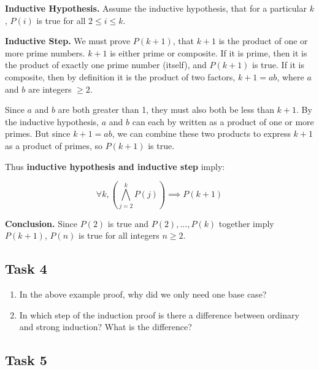 \documentclass[12pt,letterpaper]{article}
\begin{document}
\textbf{Inductive Hypothesis.} Assume the inductive hypothesis, that for a particular $k$, $P(i)$ is true for all $2 \leq i \leq k$.




\textbf{Inductive Step.} We must prove $P(k + 1)$, that $k + 1$ is the product of one or more prime numbers. $k + 1$ is either prime or composite. If it is prime, then it is the product of exactly one prime number (itself), and $P(k + 1)$ is true. If it is composite, then by definition it is the product of two factors, $k + 1 = ab$, where $a$ and $b$ are integers $\geq 2$.

Since $a$ and $b$ are both greater than 1, they must also both be less than $k + 1$. By the inductive hypothesis, $a$ and $b$ can each by written as a product of one or more primes. But since $k + 1 = ab$, we can combine these two products to express $k + 1$ as a product of primes, so $P(k + 1)$ is true.


\smallskip 

Thus \textbf{inductive hypothesis and inductive step} imply:

$$\forall k, (\bigwedge_{j=2}^k P(j))\implies P(k+1)$$

\textbf{Conclusion.} Since $P(2)$ is true and $P(2),...,P(k)$ together imply $P(k + 1)$, $P(n)$ is true for all integers $n \geq 2$.

\newpage
\subsection*{Task 4}

\begin{enumerate}
    \item In the above example proof, why did we only need one base case?
    
    \begin{mdframed} \vspace{1cm} \end{mdframed}
    
    \item In which step of the induction proof is there a difference between ordinary and strong induction? What is the difference? 
    
    \begin{mdframed} \vspace{1cm} \end{mdframed}
\end{enumerate}

\subsection*{Task 5}
\end{document}
